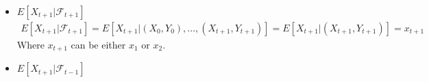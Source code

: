 \begin{itemize}
    \item $E[X_{t+1}|\mathcal{F}_{t+1}]$
    \begin{gather*}
        E[X_{t+1}|\mathcal{F}_{t+1}] = E[X_{t+1}|(X_{0},Y_{0}),...,(X_{t+1},Y_{t+1})] = E[X_{t+1}|(X_{t+1},Y_{t+1})] = x_{t+1}
    \end{gather*}
    Where $x_{t+1}$ can be either $x_{1}$ or $x_{2}$.
    \item $E[X_{t+1}|\mathcal{F}_{t-1}]$

\end{itemize}
